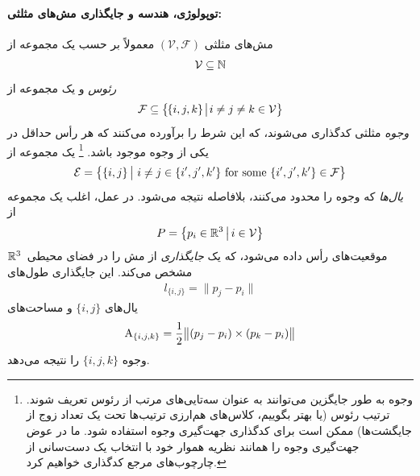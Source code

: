 \paragraph{توپولوژی، هندسه و جایگذاری مش‌های مثلثی:}
مش‌های مثلثی $(\mathcal{V},\mathcal{F})$ معمولاً بر حسب یک مجموعه از
\begin{align}
    \mathcal{V}\subseteq\mathbb{N}
\end{align}
\emph{رئوس} و یک مجموعه از
\begin{align}
    {\mathcal{F} \subseteq \big\{\mkern-2mu \{i,j,k\} \mkern2mu\big|\mkern2mu i\neq j\neq k \in\mathcal{V} \big\}}
\end{align}
\emph{وجوه} مثلثی کدگذاری می‌شوند،
که این شرط را برآورده می‌کنند که هر رأس حداقل در یکی از وجوه موجود باشد.%
\footnote{
    وجوه به طور جایگزین می‌توانند به عنوان سه‌تایی‌های مرتب از رئوس تعریف شوند.
    ترتیب رئوس (یا بهتر بگوییم، کلاس‌های هم‌ارزی ترتیب‌ها تحت یک تعداد زوج از جایگشت‌ها) ممکن است برای کدگذاری جهت‌گیری وجوه استفاده شود.
    ما در عوض جهت‌گیری وجوه را همانند نظریه هموار خود با انتخاب یک دست‌سانی از چارچوب‌های مرجع کدگذاری خواهیم کرد.
}
یک مجموعه از
\begin{align}
    \mathcal{E} = \big\{ \{i,j\} \,\big|\ i\neq j\in \{i',j',k'\} \textup{ for some } \{i',j',k'\} \in \mathcal{F} \big\}
\end{align}
\emph{یال‌ها} که وجوه را محدود می‌کنند، بلافاصله نتیجه می‌شود.
در عمل، اغلب یک مجموعه از
\begin{align}
    P = \big\{ p_i \in \mathbb{R}^3 \,\big|\, i\in\mathcal{V} \big\}
\end{align}
موقعیت‌های رأس داده می‌شود، که یک \emph{جایگذاری} از مش را در فضای محیطی~$\mathbb{R}^3$ مشخص می‌کند.
این جایگذاری طول‌های
\begin{align}
    l_{\{i,j\}} = \lVert p_j-p_i \rVert
\end{align}
یال‌های $\{i,j\}$ و مساحت‌های
\begin{align}
    \textup{A}_{\{i,j,k\}} = \frac{1}{2} \big\lVert {(p_j-p_i)} \times (p_k-p_i) \big\rVert
\end{align}
وجوه $\{i,j,k\}$ را نتیجه می‌دهد.


